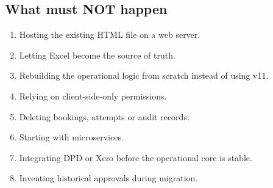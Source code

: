 \subsection*{What must NOT happen}

\begin{warningbox}
\begin{enumerate}
  \item Hosting the existing HTML file on a web server.
  \item Letting Excel become the source of truth.
  \item Rebuilding the operational logic from scratch instead of using v11.
  \item Relying on client-side-only permissions.
  \item Deleting bookings, attempts or audit records.
  \item Starting with microservices.
  \item Integrating DPD or Xero before the operational core is stable.
  \item Inventing historical approvals during migration.
\end{enumerate}
\end{warningbox}
